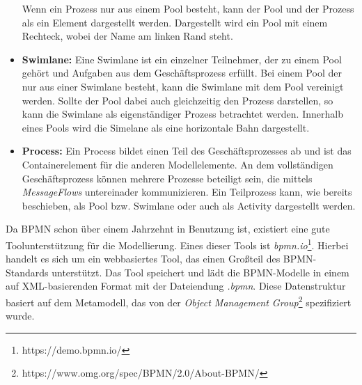 \begin{itemize}
    Wenn ein Prozess nur aus einem Pool besteht, kann der Pool und der Prozess als ein Element dargestellt werden.
    Dargestellt wird ein Pool mit einem Rechteck, wobei der Name am linken Rand steht.
    \item \textbf{Swimlane:}
    Eine Swimlane ist ein einzelner Teilnehmer, der zu einem Pool gehört und Aufgaben aus dem Geschäftsprozess erfüllt.
    Bei einem Pool der nur aus einer Swimlane besteht, kann die Swimlane mit dem Pool vereinigt werden.
    Sollte der Pool dabei auch gleichzeitig den Prozess darstellen, so kann die Swimlane als eigenständiger Prozess betrachtet werden.
    Innerhalb eines Pools wird die Simelane als eine horizontale Bahn dargestellt.
    \item \textbf{Process:}
    Ein Process bildet einen Teil des Geschäftsprozesses ab und ist das Containerelement für die anderen Modellelemente.
    An dem vollständigen Geschäftsprozess können mehrere Prozesse beteiligt sein, die mittels \emph{MessageFlows} untereinader kommunizieren.
    Ein Teilprozess kann, wie bereits beschieben, als Pool bzw. Swimlane oder auch als Activity dargestellt werden.
\end{itemize}

Da BPMN schon über einem Jahrzehnt in Benutzung ist, existiert eine gute Toolunterstützung für die Modellierung.
Eines dieser Tools ist \emph{bpmn.io}\footnote{https://demo.bpmn.io/}.
Hierbei handelt es sich um ein webbasiertes Tool, das einen Großteil des BPMN-Standards unterstützt.
Das Tool speichert und lädt die BPMN-Modelle in einem auf XML-basierenden Format mit der Dateiendung \emph{.bpmn}.
Diese Datenstruktur basiert auf dem Metamodell, das von der \emph{Object Management Group}\footnote{https://www.omg.org/spec/BPMN/2.0/About-BPMN/} spezifiziert wurde.

